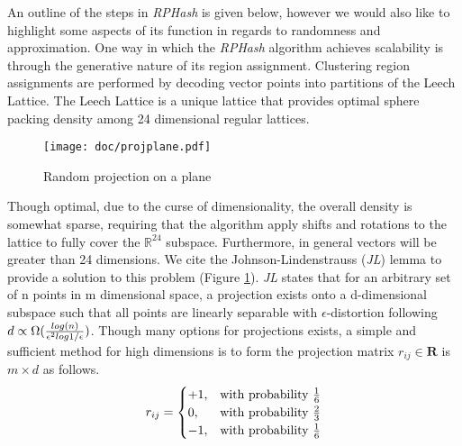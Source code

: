 \documentclass[a4paper,10pt]{article}
\begin{document}
An outline of the
steps in
\emph{RPHash} is given below, however we would also like to highlight some
aspects of its function in regards to randomness and approximation. One way in
which the \emph{RPHash} algorithm achieves scalability is through the generative
nature of
its region assignment.  Clustering region assignments are performed by decoding
vector points into partitions of the Leech Lattice.  The Leech Lattice is a
unique lattice that provides optimal sphere packing density among 24 dimensional
regular lattices\cite{Cohn}.  
\begin{figure}%
\centering
\texttt{[image: doc/projplane.pdf]}
\caption{Random projection on a plane\label{projplane}}
\end{figure}
Though optimal, due to the curse of
dimensionality, the overall density is somewhat sparse, requiring that the
algorithm apply shifts and rotations to the lattice to fully cover the
$\mathbb{R}^{24}$ subspace. Furthermore, in general vectors will be greater than
24 dimensions.  We cite the Johnson-Lindenstrauss (\emph{JL}) lemma to provide a
solution to
this problem (Figure \ref{projplane}).  \emph{JL} states that for an arbitrary
set of n
points in m dimensional space, a projection exists onto a d-dimensional subspace
such that all points are linearly separable with $\epsilon$-distortion following
$d \propto {\Omega({{ log(n) }\over {\epsilon^2 log 1/\epsilon}  })}$.  Though
many options for projections exists, a simple and sufficient method for high
dimensions
 is to form the projection matrix $r_{ij}\in\textbf{R}$ is $m\times d$ as
follows.
\[
    r_{ij}= 
\begin{cases}
    +1, & \text{with probability } {1 \over 6}\\
     0, & \text{with probability } {2 \over 3}\\
    -1, & \text{with probability } {1 \over 6}\\
\end{cases}
\]
\end{document}
